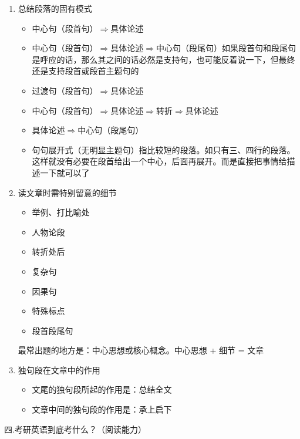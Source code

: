 \documentclass[11pt,twoside,openany,x11names,svgnames]{memoir}
\begin{document}
\begin{enumerate}
\begin{itemize}
\begin{description}
\end{description}
\end{itemize}
\item 总结段落的固有模式
\begin{itemize}
  \item 中心句（段首句）$\Rightarrow$具体论述
  \item 中心句（段首句）$\Rightarrow$具体论述$\Rightarrow$中心句（段尾句）{\color{blue}如果段首句和段尾句是呼应的话，那么其之间的话必然是支持句，也可能反着说一下，但最终还是支持段首或段首主题句的}
  \item 过渡句（段首句）$\Rightarrow$具体论述
  \item 中心句（段首句）$\Rightarrow$具体论述$\Rightarrow$转折$\Rightarrow$具体论述
  \item 具体论述$\Rightarrow$中心句（段尾句）
  \item 句句展开式（无明显主题句）指比较短的段落。{\color{blue}如只有三、四行的段落}。这样就没有必要在段首给出一个中心，后面再展开。而是直接把事情给描述一下就可以了
\end{itemize}
\item 读文章时需特别留意的细节
\begin{itemize}
  \item 举例、打比喻处
  \item 人物论段
  \item 转折处后
  \item 复杂句
  \item 因果句
  \item 特殊标点
  \item 段首段尾句
\end{itemize}
最常出题的地方是：中心思想或核心概念。中心思想 + 细节 = 文章
\item 独句段在文章中的作用
\begin{itemize}
  \item 文尾的独句段所起的作用是：总结全文
  \item 文章中间的独句段的作用是：承上启下
\end{itemize}
\end{enumerate}
四.考研英语到底考什么？（阅读能力）
\end{document}
